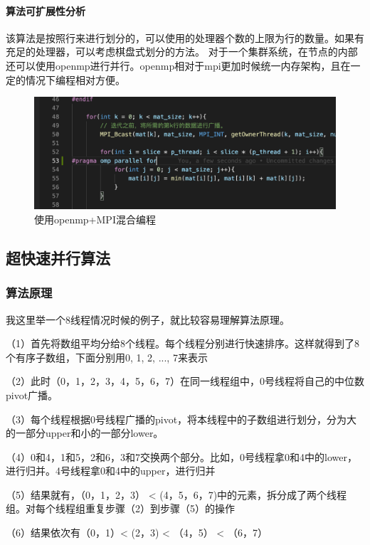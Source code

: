 \documentclass[10pt]{article}
\begin{document}
\paragraph{算法可扩展性分析}

该算法是按照行来进行划分的，可以使用的处理器个数的上限为行的数量。如果有充足的处理器，可以考虑棋盘式划分的方法。
对于一个集群系统，在节点的内部还可以使用openmp进行并行。openmp相对于mpi更加时候统一内存架构，且在一定的情况下编程相对方便。

\begin{figure}[htbp]
    \centering
    \includegraphics[width=.8\textwidth]{assets/openmp+MPI.png}
    \caption{使用openmp+MPI混合编程}
    \label{使用openmp+MPI混合编程}
\end{figure}

\subsection{超快速并行算法}

\subsubsection{算法原理}

我这里举一个8线程情况时候的例子，就比较容易理解算法原理。

（1）首先将数组平均分给8个线程。每个线程分别进行快速排序。这样就得到了8个有序子数组，下面分别用0, 1, 2, ..., 7来表示

（2）此时（0，1，2，3，4，5，6，7）在同一线程组中，0号线程将自己的中位数pivot广播。

（3）每个线程根据0号线程广播的pivot，将本线程中的子数组进行划分，分为大的一部分upper和小的一部分lower。

（4）0和4，1和5，2和6，3和7交换两个部分。比如，0号线程拿0和4中的lower，进行归并。4号线程拿0和4中的upper，进行归并

（5）结果就有，（0，1，2，3） < (4，5，6，7)中的元素，拆分成了两个线程组。对每个线程组重复步骤（2）到步骤（5）的操作

（6）结果依次有（0，1）< (2，3) < （4，5） < （6，7）
\end{document}
